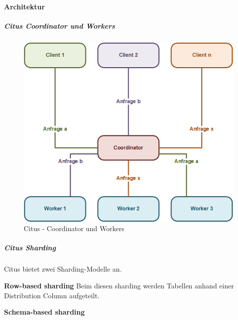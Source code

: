\begin{flushleft}
    \paragraph{Architektur}
    \begin{flushleft}
        \subparagraph{Citus Coordinator und Workers}
        \begin{figure}[H]
            \centering
            \includegraphics[width=0.75\linewidth]{source/implementation/evaluation/postgresql_ha_solutions/stackgres/citus_coordinator_worker}
            \caption{Citus - Coordinator und Workers}
            \label{fig:citus_coordinator_worker}
        \end{figure}
    \end{flushleft}
    \begin{flushleft}
        \subparagraph{Citus Sharding}
        Citus bietet zwei Sharding-Modelle an.
        \begin{flushleft}
            \textbf{Row-based sharding}
            Beim diesen sharding werden Tabellen anhand einer Distribution Column aufgeteilt. \cite{2Y5FA36C, FDUUL9IM}
        \end{flushleft}
        \begin{flushleft}
            \textbf{Schema-based sharding}
        \end{flushleft}
    \end{flushleft}
\end{flushleft}
